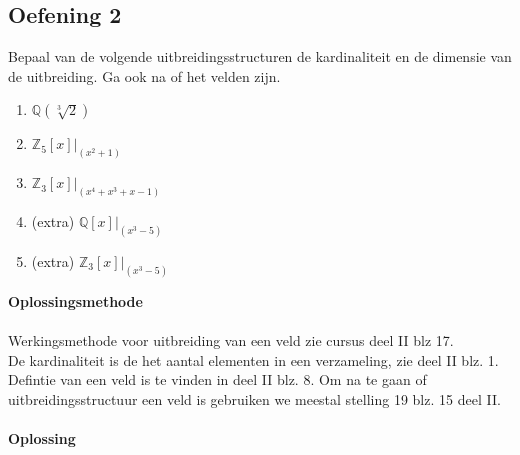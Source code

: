 \documentclass[11pt,a4paper,titlepage]{article}
\begin{document}
\subsection{Oefening 2}
Bepaal van de volgende uitbreidingsstructuren de kardinaliteit en de dimensie van de uitbreiding. Ga ook na of het velden zijn.
\begin{enumerate}[label=(\alph*)]
	\item $\mathbb{Q}(\sqrt[3]{2})$
	\item $\mathbb{Z}_5[x]|_{(x^2+1)}$
	\item $\mathbb{Z}_3[x]|_{(x^4+x^3+x-1)}$
	\item (extra) $\mathbb{Q}[x]|_{(x^3-5)}$
	\item (extra) $\mathbb{Z}_3[x]|_{(x^3-5)}$
\end{enumerate}
\textbf{Oplossingsmethode} \\ \\
Werkingsmethode voor uitbreiding van een veld zie cursus deel II blz 17.  \\
De kardinaliteit is de het aantal elementen in een verzameling, zie deel II blz. 1. \\
Defintie van een veld is te vinden in deel II  blz. 8.
Om na te gaan of uitbreidingsstructuur een veld is gebruiken we meestal stelling 19 blz. 15 deel II.
\\ \\ \textbf{Oplossing} \\
\end{document}
